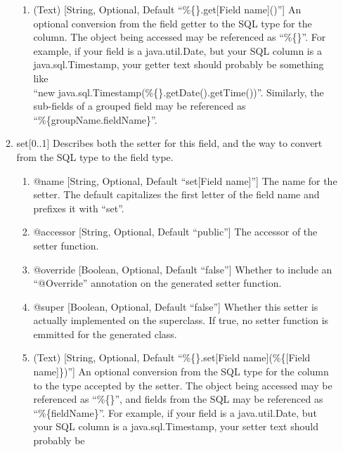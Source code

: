 \documentclass{book}
\begin{document}
\begin{enumerate}
\begin{enumerate}
\begin{enumerate}
            \item (Text) [String, Optional, Default ``\%\{\}.get[Field name]()'']
                  An optional conversion from the field getter to the SQL type
                  for the column. The object being accessed may be referenced
                  as ``\%\{\}''. For example, if your field is a java.util.Date,
                  but your SQL column is a java.sql.Timestamp, your getter text
                  should probably be something like\\
                  ``new java.sql.Timestamp(\%\{\}.getDate().getTime())''.
                  Similarly, the sub-fields of a grouped field may be referenced
                  as\\
                  ``\%\{groupName.fieldName\}''.
        \end{enumerate}
        \item set[0..1] Describes both the setter for this field, and the way to
              convert from the SQL type to the field type.
        \begin{enumerate}
            \item @name [String, Optional, Default ``set[Field name]''] The name
                  for the setter. The default capitalizes the first letter of
                  the field name and prefixes it with ``set''.
            \item @accessor [String, Optional, Default ``public''] The accessor
                  of the setter function.
            \item @override [Boolean, Optional, Default ``false''] Whether to
                  include an ``@Override'' annotation on the generated setter
                  function.
            \item @super [Boolean, Optional, Default ``false''] Whether this
                  setter is actually implemented on the superclass. If true,
                  no setter function is emmitted for the generated class.
            \item (Text) [String, Optional, Default
                  ``\%\{\}.set[Field name](\%\{[Field name]\})''] An optional
                  conversion from the SQL type for the column to the type
                  accepted by the setter. The object being accessed may be
                  referenced as ``\%\{\}'', and fields from the SQL may be
                  referenced as ``\%\{fieldName\}''. For example, if your field
                  is a java.util.Date, but your SQL column is a
                  java.sql.Timestamp, your setter text should probably be

\end{enumerate}
\end{enumerate}
\end{enumerate}
\end{document}
